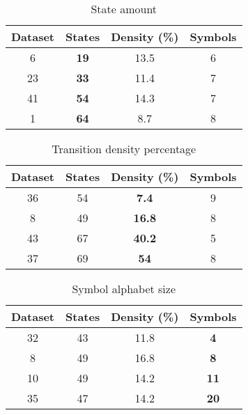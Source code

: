 \FloatBarrier

\begin{table}
\centering
{
\begin{tabular}{| c | c | c | c |}
  \hline
  Dataset 	& \textbf{States} 	& Density (\%) 	& Symbols \\  \hline
  6 			& \textbf{19 }			&	13.5				& 6 \\
  23 			& \textbf{33} 			&	11.4				& 7 \\
  41			& \textbf{54} 			&	14.3				& 7 \\
  1				& \textbf{64} 			&	8.7				& 8 \\ \hline
\end{tabular}
\caption{State amount}
\label{state_table}
}
\end{table}

\begin{table}
\centering
{
\begin{tabular}{| c | c | c | c |}
  \hline
  Dataset 	& States  			& \textbf{Density (\%)} 		& Symbols \\  \hline
  36 			&	54					& \textbf{7.4 }						& 9 \\
  8 			&	49					& \textbf{16.8 }					& 8 \\
  43			&	67					& \textbf{40.2 }					& 5 \\
  37			&	69					& \textbf{54 	}					& 8 \\ \hline
\end{tabular}
\caption{Transition density percentage}
\label{density_table}
}
\end{table}

\begin{table}
\centering
{
\begin{tabular}{| c | c | c | c |}
  \hline
  Dataset 	& States	 	& Density (\%) 	& \textbf{Symbols}	 \\  \hline
  32 			& 43				& 11.8				& \textbf{4}		\\
  8 			& 49				& 16.8 				& \textbf{8}		\\
  10			& 49				& 14.2 				& \textbf{11}	\\
  35			& 47				& 14.2 				& \textbf{20}	\\ \hline
\end{tabular}
\caption{Symbol alphabet size}
\label{symbol_table}

}
\end{table}
